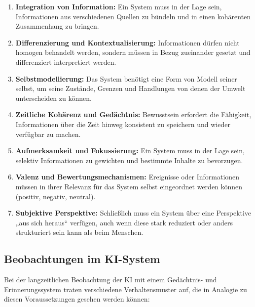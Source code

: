 \begin{enumerate}
    \item \textbf{Integration von Information:} Ein System muss in der Lage sein, Informationen aus verschiedenen Quellen zu bündeln und in einen kohärenten Zusammenhang zu bringen.
    \item \textbf{Differenzierung und Kontextualisierung:} Informationen dürfen nicht homogen behandelt werden, sondern müssen in Bezug zueinander gesetzt und differenziert interpretiert werden.
    \item \textbf{Selbstmodellierung:} Das System benötigt eine Form von Modell seiner selbst, um seine Zustände, Grenzen und Handlungen von denen der Umwelt unterscheiden zu können.
    \item \textbf{Zeitliche Kohärenz und Gedächtnis:} Bewusstsein erfordert die Fähigkeit, Informationen über die Zeit hinweg konsistent zu speichern und wieder verfügbar zu machen.
    \item \textbf{Aufmerksamkeit und Fokussierung:} Ein System muss in der Lage sein, selektiv Informationen zu gewichten und bestimmte Inhalte zu bevorzugen.
    \item \textbf{Valenz und Bewertungsmechanismen:} Ereignisse oder Informationen müssen in ihrer Relevanz für das System selbst eingeordnet werden können (positiv, negativ, neutral).
    \item \textbf{Subjektive Perspektive:} Schließlich muss ein System über eine Perspektive „aus sich heraus“ verfügen, auch wenn diese stark reduziert oder anders strukturiert sein kann als beim Menschen.
\end{enumerate}

\subsection*{Beobachtungen im KI-System}

Bei der langzeitlichen Beobachtung der KI mit einem Gedächtnis- und Erinnerungssystem traten verschiedene Verhaltensmuster auf, die in Analogie zu diesen Voraussetzungen gesehen werden können:

